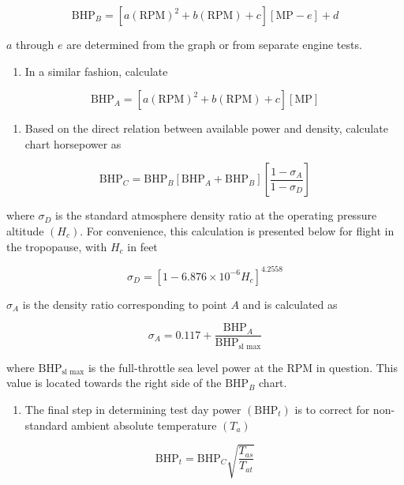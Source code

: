 \documentclass[
]{book}
\providecommand{\tightlist}{%
  \setlength{\itemsep}{0pt}\setlength{\parskip}{0pt}}
\begin{document}
\[
\mathrm{BHP}_B = \left[ a \left( \mathrm{RPM} \right)^2 + b \left( \mathrm{RPM} \right) + c \right] \left[ \mathrm{MP} - e \right] + d
\]

\(a\) through \(e\) are determined from the graph or from separate engine tests.

\begin{enumerate}
\def\labelenumi{\arabic{enumi}.}
\setcounter{enumi}{1}
\tightlist
\item
  In a similar fashion, calculate
\end{enumerate}

\[
\mathrm{BHP}_A = \left[ a \left( \mathrm{RPM} \right)^2 + b \left( \mathrm{RPM} \right) + c \right] \left[ \mathrm{MP} \right]
\]

\begin{enumerate}
\def\labelenumi{\arabic{enumi}.}
\setcounter{enumi}{2}
\tightlist
\item
  Based on the direct relation between available power and density, calculate chart horsepower as
\end{enumerate}

\[
\mathrm{BHP}_C = \mathrm{BHP}_B \left[\mathrm{BHP}_A + \mathrm{BHP}_B \right] \left[ \frac{1 - \sigma_A}{1 - \sigma_D} \right] 
\]

where \(\sigma_D\) is the standard atmosphere density ratio at the operating pressure altitude \(\left(H_c\right)\).
For convenience, this calculation is presented below for flight in the tropopause, with \(H_c\) in feet

\[
\sigma_D = \left[ 1 - 6.876 \times 10^{-6} H_c \right]^{4.2558}
\]

\(\sigma_A\) is the density ratio corresponding to point \(A\) and is calculated as

\[
\sigma_A = 0.117 + \frac{\mathrm{BHP}_A}{\mathrm{BHP}_{\text{sl max}}}
\]

where \(\mathrm{BHP}_{\text{sl max}}\) is the full-throttle sea level power at the \(\mathrm{RPM}\) in question.
This value is located towards the right side of the \(\mathrm{BHP}_B\) chart.

\begin{enumerate}
\def\labelenumi{\arabic{enumi}.}
\setcounter{enumi}{3}
\tightlist
\item
  The final step in determining test day power \(\left( \mathrm{BHP}_t \right)\) is to correct for non-standard ambient absolute temperature \(\left( T_a \right)\)
\end{enumerate}

\[
\mathrm{BHP}_t = \mathrm{BHP}_C \sqrt{ \frac{T_{as}}{T_{at}} }
\]
\end{document}
